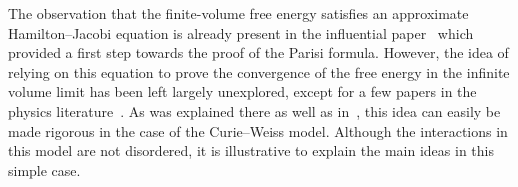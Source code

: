 \documentclass[10pt]{amsart}
\theoremstyle{definition}\newtheorem{defi}[theo]{Definition}\newtheorem{rema}[theo]{Remark}\newtheorem{exam}[theo]{Example}\newtheorem{exem}[theo]{Example}\newtheorem{nota}[theo]{Notation}
\newcommand{\1}{\mathds{1}}
\begin{document}


The observation that the finite-volume free energy satisfies an approximate Hamil\-ton--Jacobi equation is already present in the influential paper~\cite{sumrules} which provided a first step towards the proof of the Parisi formula. However, the idea of relying on this equation to prove the convergence of the free energy in the infinite volume limit has been left largely unexplored, except for a few papers in the physics literature~\cite{barra1,barra2}. As was explained there as well as in~\cite{bra83,new86}, this idea can easily be made rigorous in the case of the Curie--Weiss model. Although the interactions in this model are not disordered, it is illustrative to explain the main ideas in this simple case.

\end{document}
